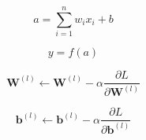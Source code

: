 \documentclass{article}
\begin{document}
\begin{tcolorbox}[colback=pastelblue, colframe=pastelblue]
\begin{equation}
    a = \sum_{i=1}^{n} w_i x_i + b
\end{equation}
\end{tcolorbox}

\begin{tcolorbox}[colback=pastelpurple, colframe=pastelpurple]
\begin{equation}
    y = f(a)
\end{equation}
\end{tcolorbox}

\begin{equation}
\mathbf{W}^{(l)} \leftarrow \mathbf{W}^{(l)} - \alpha \frac{\partial L}{\partial \mathbf{W}^{(l)}}
\end{equation}

\begin{equation}
\mathbf{b}^{(l)} \leftarrow \mathbf{b}^{(l)} - \alpha \frac{\partial L}{\partial \mathbf{b}^{(l)}}
\end{equation}
\end{document}
